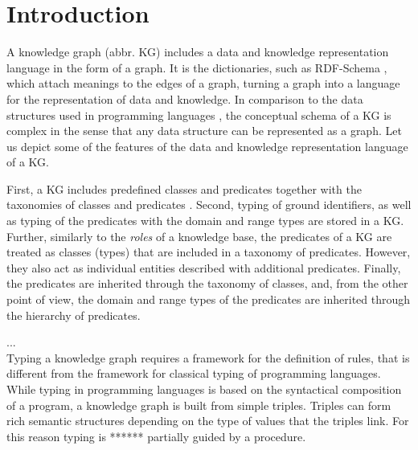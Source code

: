 \documentclass[runningheads]{llncs}
\begin{document}
\thispagestyle{headings}




\section{Introduction}

A knowledge graph (abbr. KG) includes a data and knowledge
representation language in the form of a graph. It is the
dictionaries, such as RDF-Schema \cite{rdfschema}, which attach
meanings to the edges of a graph, turning a graph into a language for
the representation of data and knowledge. In comparison to the data
structures used in programming languages
\cite{Pierce2002,Hindley1997}, the conceptual schema of a KG is
complex in the sense that any data structure can be represented as a
graph. Let us depict some of the features of the data and knowledge
representation language of a KG.

First, a KG includes predefined classes and predicates together with
the taxonomies of classes and predicates \cite{Baader2002}. Second,
typing of ground identifiers, as well as typing of the predicates with
the domain and range types are stored in a KG. Further, similarly to
the \emph{roles} \cite{Brachman1985} of a knowledge base, the
predicates of a KG are treated as classes (types) that are included in
a taxonomy of predicates. However, they also act as individual
entities described with additional predicates. Finally, the predicates
are inherited through the taxonomy of classes, and, from the other
point of view, the domain and range types of the predicates are
inherited through the hierarchy of predicates.


... \\

Typing a knowledge graph requires a framework for the definition of
rules, that is different from the framework for classical typing of
programming languages. While typing in programming languages is based
on the syntactical composition of a program, a knowledge graph is
built from simple triples. Triples can form rich semantic structures
depending on the type of values that the triples link. For this reason
typing is ****** partially guided by a procedure.
\end{document}
